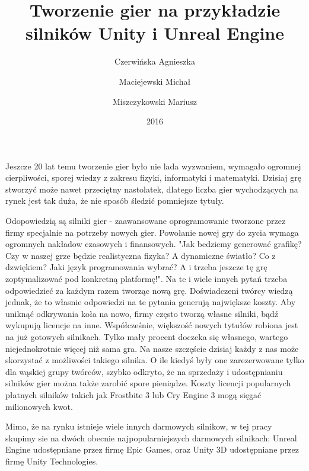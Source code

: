 \documentclass[brudnopis]{xmgr}
\author   {Czerwińska Agnieszka}
\author   {Maciejewski Michał}
\author   {Miszczykowski Mariusz}
\title    {Tworzenie gier na przykładzie silników Unity i Unreal Engine}
\date     {2016}
\begin{document}
\begin{abstract}
\end{abstract}


\maketitle

\introduction

Jeszcze 20 lat temu tworzenie gier było nie lada wyzwaniem, wymagało ogromnej cierpliwości, sporej wiedzy z zakresu fizyki, informatyki i matematyki. Dzisiaj grę stworzyć może nawet przeciętny nastolatek, dlatego liczba gier wychodzących na rynek jest tak duża, że nie sposób śledzić pomniejsze tytuły.

Odopowiedzią są silniki gier - zaawansowane oprogramowanie tworzone przez firmy specjalnie na potrzeby nowych gier. Powołanie nowej gry do zycia wymaga ogromnych nakładow czasowych i finansowych. "Jak bedziemy generować grafikę? Czy w naszej grze będzie realistyczna fizyka? A dynamiczne światło? Co z dzwiękiem? Jaki język programowania wybrać? A i trzeba jeszcze tę grę zoptymalizować pod konkretną platformę!". Na te i wiele innych pytań trzeba odpowiedzieć za każdym razem tworząc nową grę. Doświadczeni twórcy wiedzą jednak, że to własnie odpowiedzi na te pytania generują największe koszty. Aby uniknąć odkrywania koła na nowo, firmy często tworzą własne silniki, bądź wykupują licencje na inne. Współcześnie, większość nowych tytułów robiona jest na już gotowych silnikach. Tylko mały procent doczeka się własnego, wartego niejednokrotnie więcej niż sama gra. Na nasze szczęście dzisiaj każdy z nas może skorzystać z możliwości takiego silnika. O ile kiedyś były one zarezerwowane tylko dla wąskiej grupy twórców, szybko odkryto, że na sprzedaży i udostępnianiu silników gier można także zarobić spore pieniądze. Koszty licencji popularnych płatnych silników takich jak Frostbite 3 lub Cry Engine 3 mogą sięgać milionowych kwot.

Mimo, że na rynku istnieje wiele innych darmowych silnikow, w tej pracy skupimy sie na dwóch obecnie najpopularniejszych darmowych silnikach: Unreal Engine udostępniane przez firmę Epic Games, oraz Unity 3D udostępniane przez firmę Unity Technologies.
\end{document}
